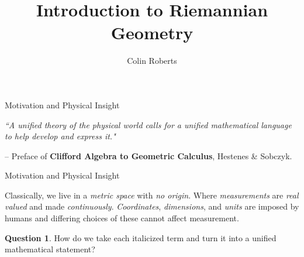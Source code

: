 \documentclass[usenames,dvipsnames]{beamer}
\title{Introduction to Riemannian Geometry}
\author{Colin Roberts}
\theoremstyle{definition}
\newtheorem*{question}{Question}
\theoremstyle{theorem}
\begin{document}
{
\begin{frame}
\titlepage
\end{frame}
}


        \begin{frame}{Motivation and Physical Insight}
            \begin{paragraph}
                \textit{``A unified theory of the physical world calls for a unified mathematical language to help develop and express it."}
            \end{paragraph}
            \vspace*{0.5cm}
            -- Preface of \textbf{Clifford Algebra to Geometric Calculus}, Hestenes \& Sobczyk.
        \end{frame}

        \begin{frame}{Motivation and Physical Insight}
            
            \begin{paragraph}
            Classically, we live in a \emph{metric space} with \emph{no origin}.  Where \emph{measurements} are \emph{real valued} and made \emph{continuously}.  \emph{Coordinates}, \emph{dimensions}, and \emph{units} are imposed by humans and differing choices of these cannot affect measurement.  
            \end{paragraph}
            
            \vspace*{1cm}
            
            \begin{question}
            How do we take each italicized term and turn it into a unified mathematical statement?
            \end{question}
        \end{frame}
        
\end{document}

